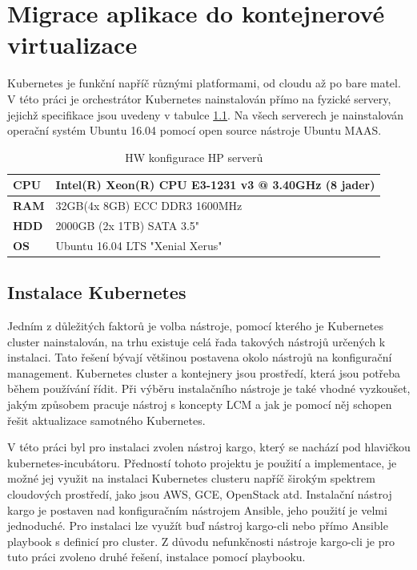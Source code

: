 \chapter{Migrace aplikace do kontejnerové virtualizace}
Kubernetes je funkční napříč různými platformami, od cloudu až po bare matel. V této práci je orchestrátor Kubernetes nainstalován přímo na fyzické servery, jejichž specifikace jsou uvedeny v tabulce \ref{tbl:hp_hardware}. Na všech serverech je nainstalován operační systém Ubuntu 16.04 pomocí open source nástroje Ubuntu MAAS.

\begin{table}[H]
\begin{center}
\caption{HW konfigurace HP serverů}
\label{tbl:hp_hardware}
\begin{tabular}{|l|l|}
\hline
\textbf{CPU} & Intel(R) Xeon(R) CPU E3-1231 v3 @ 3.40GHz (8 jader)\\
\hline
\textbf{RAM} & 32GB(4x 8GB) ECC DDR3 1600MHz \\
\hline
\textbf{HDD} & 2000GB (2x 1TB)  SATA 3.5" \\
\hline
\textbf{OS} & Ubuntu 16.04 LTS "Xenial Xerus" \\
\hline
\end{tabular}
\end{center}
\end{table}


\section{Instalace Kubernetes}
Jedním z důležitých faktorů je volba nástroje, pomocí kterého je Kubernetes cluster nainstalován, na trhu existuje celá řada takových nástrojů určených k instalaci. Tato řešení bývají většinou postavena okolo nástrojů na konfigurační management. Kubernetes cluster a kontejnery jsou prostředí, která jsou potřeba během používání řídit. Při výběru instalačního nástroje je také vhodné vyzkoušet, jakým způsobem  pracuje nástroj s koncepty LCM a jak je pomocí něj schopen řešit aktualizace samotného Kubernetes.

V této práci byl pro instalaci zvolen nástroj kargo, který se nachází pod hlavičkou kubernetes-incubátoru. Předností tohoto projektu je použití a implementace, je možné jej využit na instalaci Kubernetes clusteru napříč širokým spektrem cloudových prostředí, jako jsou AWS, GCE, OpenStack atd. Instalační nástroj kargo je postaven nad konfiguračním nástrojem Ansible, jeho použití je velmi jednoduché. Pro instalaci lze využít buď nástroj kargo-cli nebo přímo Ansible playbook s definicí pro cluster. Z důvodu nefunkčnosti nástroje kargo-cli je pro tuto práci zvoleno druhé řešení, instalace pomocí playbooku.

